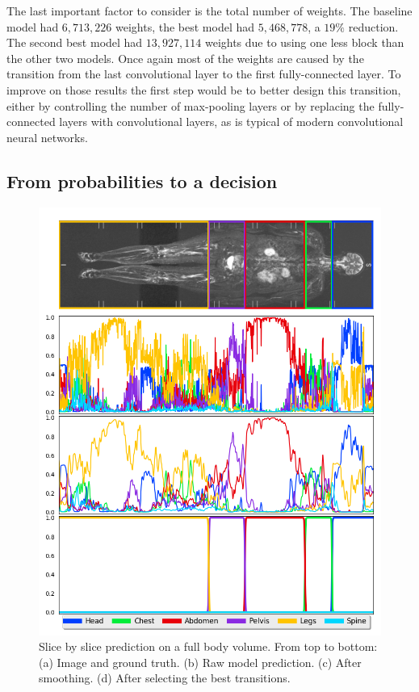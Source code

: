 The last important factor to consider is the total number of weights. The baseline model had $6,713,226$ weights, the best model had $5,468,778$, a $19 \%$ reduction. The second best model had $13,927,114$ weights due to using one less block than the other two models. Once again most of the weights are caused by the transition from the last convolutional layer to the first fully-connected layer. To improve on those results the first step would be to better design this transition, either by controlling the number of max-pooling layers or by replacing the fully-connected layers with convolutional layers, as is typical of modern convolutional neural networks. 

\subsection{From probabilities to a decision}

\begin{figure}[htbp]
	\centering
	\includegraphics[width=\linewidth]{img_hyperopt/fullbody}
	\caption{Slice by slice prediction on a full body volume. From top to bottom: (a) Image and ground truth. (b) Raw model prediction. (c) After smoothing. (d) After selecting the best transitions.}
	\label{fig:full_body}
\end{figure}

